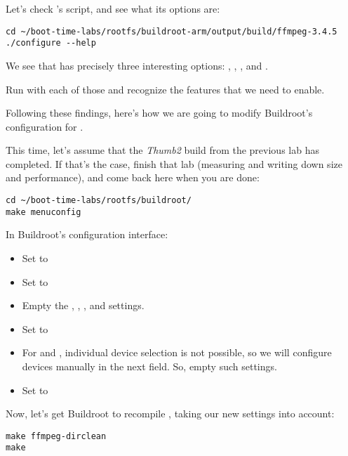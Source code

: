 Let's check 's  script, and see what its
options are:

\begin{verbatim}
cd ~/boot-time-labs/rootfs/buildroot-arm/output/build/ffmpeg-3.4.5
./configure --help
\end{verbatim}

We see that  has precisely three interesting options:
, , ,
 and .

Run  with each of those and recognize the features that
we need to enable.

Following these findings, here's how we are going to modify Buildroot's
configuration for .

This time, let's assume that the {\em Thumb2} build from the previous
lab has completed. If that's the case, finish that lab (measuring and
writing down size and performance), and come back here when you are done:

\begin{verbatim}
cd ~/boot-time-labs/rootfs/buildroot/
make menuconfig
\end{verbatim}

In Buildroot's configuration interface:

\begin{itemize}
\item Set  to 
\item Set  to 
\item Empty the , ,
      ,  and  settings.
\item Set  to 
\item For  and ,
      individual device selection is not possible, so we will configure
      devices manually in the next field. So, empty such settings.
\item Set  to
\end{itemize}

Now, let's get Buildroot to recompile , taking our new
settings into account:

\begin{verbatim}
make ffmpeg-dirclean
make
\end{verbatim}

